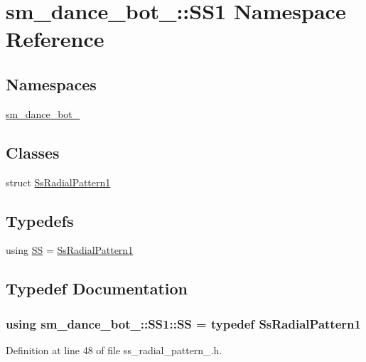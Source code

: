 \hypertarget{namespacesm__dance__bot__3_1_1SS1}{}\section{sm\+\_\+dance\+\_\+bot\+\_\+:\+:S\+S1 Namespace Reference}
\label{namespacesm__dance__bot__3_1_1SS1}
\subsection*{Namespaces}
\begin{DoxyCompactItemize}
\item 
 \hyperlink{namespacesm__dance__bot__3_1_1SS1_1_1sm__dance__bot__3}{sm\+\_\+dance\+\_\+bot\+\_}
\end{DoxyCompactItemize}
\subsection*{Classes}
\begin{DoxyCompactItemize}
\item 
struct \hyperlink{structsm__dance__bot__3_1_1SS1_1_1SsRadialPattern1}{Ss\+Radial\+Pattern1}
\end{DoxyCompactItemize}
\subsection*{Typedefs}
\begin{DoxyCompactItemize}
\item 
using \hyperlink{namespacesm__dance__bot__3_1_1SS1_aa6a573d7866d8b69696b0c840eadc8fc}{SS} = \hyperlink{structsm__dance__bot__3_1_1SS1_1_1SsRadialPattern1}{Ss\+Radial\+Pattern1}
\end{DoxyCompactItemize}


\subsection{Typedef Documentation}
\subsubsection[{\texorpdfstring{SS}{SS}}]{\setlength{\rightskip}{0pt plus 5cm}using {\bf sm\+\_\+dance\+\_\+bot\+\_\+::\+S\+S1\+::\+SS} = typedef {\bf Ss\+Radial\+Pattern1}}\hypertarget{namespacesm__dance__bot__3_1_1SS1_aa6a573d7866d8b69696b0c840eadc8fc}{}\label{namespacesm__dance__bot__3_1_1SS1_aa6a573d7866d8b69696b0c840eadc8fc}


Definition at line 48 of file ss\+\_\+radial\+\_\+pattern\+\_.\+h.

